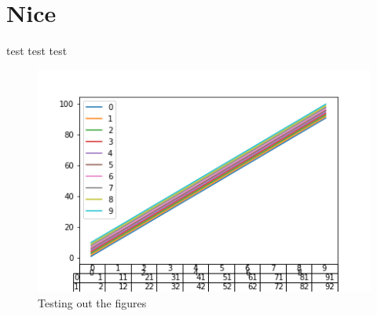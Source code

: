 \chapter{Nice}
test test test \cite{gijonmanchenoMappingMangroveOpportunities2021}





\begin{figure}[htbp]
  \centering
  \includegraphics[]{../figures/testfig.png}
  \caption{Testing out the figures}
  \label{testfig}
\end{figure}